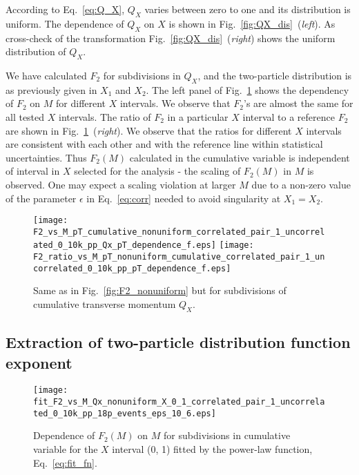 \documentclass[floatfix,superscriptaddress,a4paper,
               nofootinbib,preprint]{revtex4}
\begin{document}
According to Eq.~\ref{eq:Q_X}, $Q_X$ varies between zero to one and its distribution is uniform. The dependence of $Q_X$ on $X$ is shown in 
Fig.~\ref{fig:QX_dis}~(\textit{left}). As cross-check of the transformation
Fig.~\ref{fig:QX_dis}~(\textit{right}) shows the uniform distribution of $Q_X$.


We have calculated $F_2$ for subdivisions in $Q_X$, and the two-particle distribution is as previously given in $X_1$ and $X_2$. The left panel of Fig.~\ref{fig:F2_uniform} shows the dependency of $F_2$ on $M$ for different $X$ intervals. We observe that $F_2$'s are almost the same for all tested $X$ intervals. The ratio of $F_2$ in a particular $X$ interval to a reference $F_2$ are shown in 
Fig.~\ref{fig:F2_uniform}~(\textit{right}). We observe that the ratios for different $X$ intervals are consistent with each other and with the reference line within statistical uncertainties. Thus $F_2(M)$ calculated in the cumulative variable is independent of interval in $X$ selected for the analysis - the scaling of $F_2(M)$ in $M$ is observed. One may expect a scaling violation at larger $M$ due to a non-zero value of the parameter $\epsilon$ in Eq.~\ref{eq:corr} needed to avoid singularity at $X_1 = X_2$.


\begin{figure}
\centering
 \begin{center}
\vspace{-0.2cm}
\texttt{[image: F2\_vs\_M\_pT\_cumulative\_nonuniform\_correlated\_pair\_1\_uncorrelated\_0\_10k\_pp\_Qx\_pT\_dependence\_f.eps]}
\texttt{[image: F2\_ratio\_vs\_M\_pT\_nonuniform\_cumulative\_correlated\_pair\_1\_uncorrelated\_0\_10k\_pp\_pT\_dependence\_f.eps]}
\end{center}
\caption{Same as in Fig.~\ref{fig:F2_nonuniform}
but for subdivisions of cumulative transverse momentum $Q_X$.}
\label{fig:F2_uniform}
\end{figure}



\subsection{Extraction of two-particle distribution function exponent}


\begin{figure}
\centering
 \begin{center}
\texttt{[image: fit\_F2\_vs\_M\_Qx\_nonuniform\_X\_0\_1\_correlated\_pair\_1\_uncorrelated\_0\_10k\_pp\_18p\_events\_eps\_10\_6.eps]}
\end{center}
\caption{Dependence of $F_2(M)$ on $M$ for subdivisions in cumulative variable for the $X$ interval (0, 1) fitted by the power-law function, Eq.~\ref{eq:fit_fn}.}
\label{fig:F2_fitting}
\end{figure}
\end{document}

